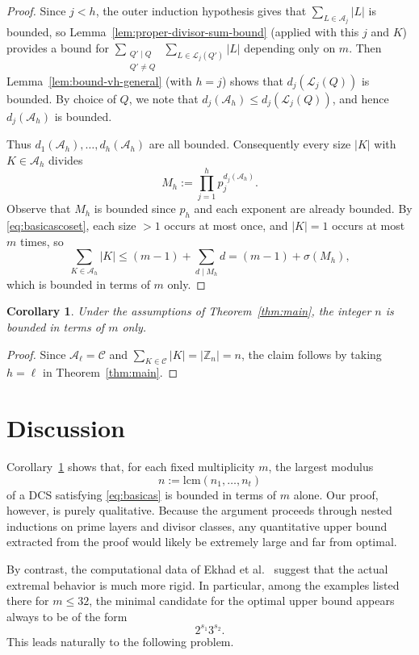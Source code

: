 \documentclass[11pt,reqno]{amsart}
\newtheorem{corollary}[theorem]{Corollary}
\theoremstyle{definition}
\newcommand{\Z}{\mathbb{Z}}
\newcommand{\Cset}{\mathcal{C}}
\newcommand{\Aset}{\mathcal{A}}
\newcommand{\Lset}{\mathcal{L}}
\begin{document}
\begin{proof}
Since \(j<h\), the outer induction hypothesis gives that \(\sum_{L\in\Aset_j}|L|\) is bounded,
so Lemma~\ref{lem:proper-divisor-sum-bound} (applied with this \(j\) and \(K\)) provides a bound for
\(\sum_{\substack{Q'\mid Q\\ Q'\neq Q}}\ \sum_{L\in\Lset_j(Q')} |L|\) depending only on \(m\).
Then Lemma~\ref{lem:bound-vh-general} (with \(h=j\)) shows that \(d_j(\Lset_j(Q))\) is bounded. 
By choice of \(Q\), we note that \(d_j(\Aset_h)\le d_j(\Lset_j(Q))\), and hence \(d_j(\Aset_h)\) is bounded.

Thus \(d_1(\Aset_h),\dots,d_h(\Aset_h)\) are all bounded.
Consequently every size \(|K|\) with \(K\in\Aset_h\) divides
\[
M_h:=\prod_{j=1}^{h} p_j^{d_j(\Aset_h)}.
\]
Observe that \(M_h\) is bounded since \(p_h\) and each exponent are already bounded. By \eqref{eq:basicascoset}, each size \(>1\) occurs at most once, and \(|K|=1\) occurs at most \(m\) times, so
\[
\sum_{K\in\Aset_h}|K|
\le
(m-1)+\sum_{d\mid M_h} d
=
(m-1)+\sigma(M_h),
\]
which is bounded in terms of \(m\) only.
\end{proof}

\begin{corollary}\label{cor:main-coset}
Under the assumptions of Theorem~\ref{thm:main}, the integer \(n\) is bounded in terms of \(m\) only.
\end{corollary}

\begin{proof}
Since \(\Aset_\ell=\Cset\) and \(\sum_{K\in\Cset}|K|=|\Z_n|=n\),
the claim follows by taking \(h=\ell\) in Theorem~\ref{thm:main}.
\end{proof}

\section{Discussion}

Corollary~\ref{cor:main-coset} shows that, for each fixed multiplicity \(m\), the largest modulus
\[
n:=\mathrm{lcm}(n_1,\dots,n_t)
\]
of a DCS satisfying \eqref{eq:basicas} is bounded in terms of \(m\) alone. 
Our proof, however, is purely qualitative. 
Because the argument proceeds through nested inductions on prime layers and divisor classes, any quantitative upper bound extracted from the proof would likely be extremely large and far from optimal.

By contrast, the computational data of Ekhad et al.~\cite{EFZ} suggest that the actual extremal behavior is much more rigid. 
In particular, among the examples listed there for \(m\le 32\), the minimal candidate for the optimal upper bound appears always to be of the form
\[
2^{s_1}3^{s_2}.
\]
This leads naturally to the following problem.
\end{document}
